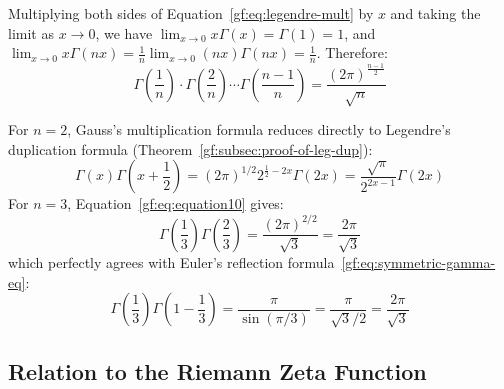 \documentclass[a4paper]{article}
\begin{document}
    \begin{corollary}
        Multiplying both sides of Equation~\eqref{gf:eq:legendre-mult} by $x$ and taking the limit as $x \to 0$, we have $\lim_{x \to 0} x \Gamma(x) = \Gamma(1) = 1$, and $\lim_{x \to 0} x \Gamma(nx) = \frac{1}{n} \lim_{x \to 0} (nx)\Gamma(nx) = \frac{1}{n}$.
        Therefore:
        \begin{equation}
            \label{gf:eq:equation10}
            \boxed{
                \Gamma\left(\frac{1}{n}\right) \cdot \Gamma\left(\frac{2}{n}\right) \cdots \Gamma\left(\frac{n-1}{n}\right) = \frac{(2 \pi)^{\frac{n-1}{2}}}{\sqrt{n}}
            }
        \end{equation}
    \end{corollary}

    \begin{example}
        For $n = 2$, Gauss's multiplication formula reduces directly to Legendre's duplication formula (Theorem~\ref{gf:subsec:proof-of-leg-dup}):
        \begin{equation*}
            \Gamma(x) \Gamma\left(x + \frac{1}{2}\right) = (2\pi)^{1/2} 2^{\frac{1}{2} - 2x} \Gamma(2x) = \frac{\sqrt{\pi}}{2^{2x-1}} \Gamma(2x)
        \end{equation*}
        For $n = 3$, Equation~\eqref{gf:eq:equation10} gives:
        \begin{equation*}
            \Gamma\left(\frac{1}{3}\right) \Gamma\left(\frac{2}{3}\right) = \frac{(2\pi)^{2/2}}{\sqrt{3}} = \frac{2\pi}{\sqrt{3}}
        \end{equation*}
        which perfectly agrees with Euler's reflection formula~\eqref{gf:eq:symmetric-gamma-eq}:
        \begin{equation*}
            \Gamma\left(\frac{1}{3}\right) \Gamma\left(1 - \frac{1}{3}\right) = \frac{\pi}{\sin(\pi/3)} = \frac{\pi}{\sqrt{3}/2} = \frac{2\pi}{\sqrt{3}}
        \end{equation*}
    \end{example}

    \subsection{Relation to the Riemann Zeta Function}\label{gf:subsec:relation-to-zeta}
\end{document}
